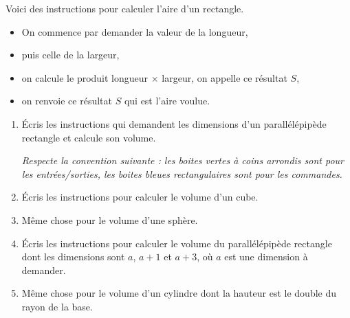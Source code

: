 \documentclass[class=report,crop=false, 12pt]{standalone}
\begin{document}


\begin{activite}

Voici des instructions pour calculer l'aire d'un rectangle.

\vspace*{-1ex}


\vspace*{-1ex}

\begin{itemize}
  \item On commence par demander la valeur de la longueur,
  \item puis celle de la largeur,
  \item on calcule le produit longueur $\times$ largeur, on appelle ce résultat $S$,
  \item on renvoie ce résultat $S$ qui est l'aire voulue.
\end{itemize}

\begin{enumerate}
  \item Écris les instructions qui demandent les dimensions d'un parallélépipède rectangle et calcule son volume.
  
  \emph{Respecte la convention suivante : les boites vertes à coins arrondis sont pour les entrées\slash sorties, les boites bleues rectangulaires sont pour les commandes.}
  
  \item Écris les instructions pour calculer le volume d'un cube. %
  
  \item Même chose pour le volume d'une sphère.
    
  \item Écris les instructions pour calculer le volume du parallélépipède rectangle dont les dimensions sont $a$, $a+1$ et $a+3$, où $a$ est une dimension à demander.  
  
  \item Même chose pour le volume d'un cylindre dont la hauteur est le double du rayon de la base.  
  
\end{enumerate}

\vspace*{-2ex}
\end{activite}
\end{document}
